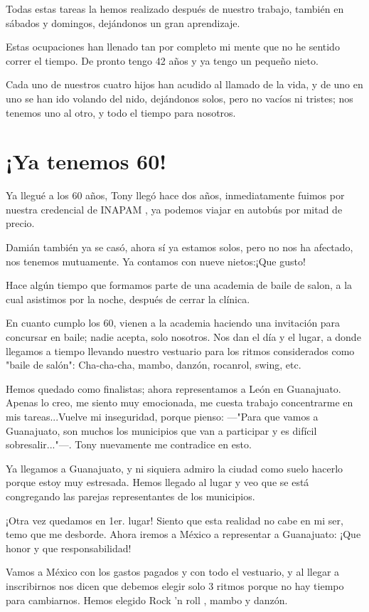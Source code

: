 \documentclass[letterpaper, 12pt]{book}
\begin{document}
Todas estas tareas la hemos realizado después de nuestro trabajo, también en sábados y domingos, dejándonos un gran aprendizaje.

Estas ocupaciones han llenado tan por completo mi mente que no he sentido correr el tiempo. De pronto tengo 42 años y ya tengo un pequeño nieto.

Cada uno de nuestros cuatro hijos han acudido al llamado de la vida, y de uno en uno se han ido volando del nido, dejándonos solos, pero no vacíos ni tristes; nos tenemos uno al otro, y todo el tiempo para nosotros.

\chapter{¡Ya tenemos 60!}
Ya llegué a los 60 años, Tony llegó hace dos años, inmediatamente fuimos por nuestra credencial de INAPAM , ya podemos viajar en autobús por mitad de precio.

Damián también ya se casó, ahora sí ya estamos solos, pero no nos ha afectado, nos tenemos mutuamente. Ya contamos con nueve nietos:¡Que gusto!  

Hace algún tiempo que formamos parte de una academia de baile de salon, a la cual asistimos por la noche, después de cerrar la clínica.

En cuanto cumplo los 60, vienen a la academia haciendo una invitación para concursar en baile; nadie acepta, solo nosotros. Nos dan el día y el lugar, a donde llegamos a tiempo llevando nuestro vestuario para los ritmos considerados como "baile de salón": Cha-cha-cha, mambo, danzón, rocanrol, swing, etc.

Hemos quedado como finalistas; ahora representamos a León en Guanajuato.  Apenas lo creo, me siento muy emocionada, me cuesta trabajo concentrarme en mis tareas...Vuelve mi inseguridad, porque pienso: ---"Para que vamos a Guanajuato, son muchos los municipios que van a participar y es difícil sobresalir..."---. Tony nuevamente me contradice en esto. 

Ya llegamos a Guanajuato, y ni siquiera admiro la ciudad como suelo hacerlo porque estoy muy estresada. Hemos llegado al lugar y veo que se está congregando las parejas representantes de los municipios.

¡Otra vez quedamos en 1er. lugar! Siento que esta realidad no cabe en mi ser, temo que me desborde. Ahora iremos a México a representar a Guanajuato: ¡Que honor y que responsabilidad!

Vamos a México con los gastos pagados y con todo el vestuario, y al llegar a inscribirnos nos dicen que debemos elegir solo 3 ritmos porque no hay tiempo para cambiarnos. Hemos elegido Rock 'n roll , mambo y danzón.
\end{document}
